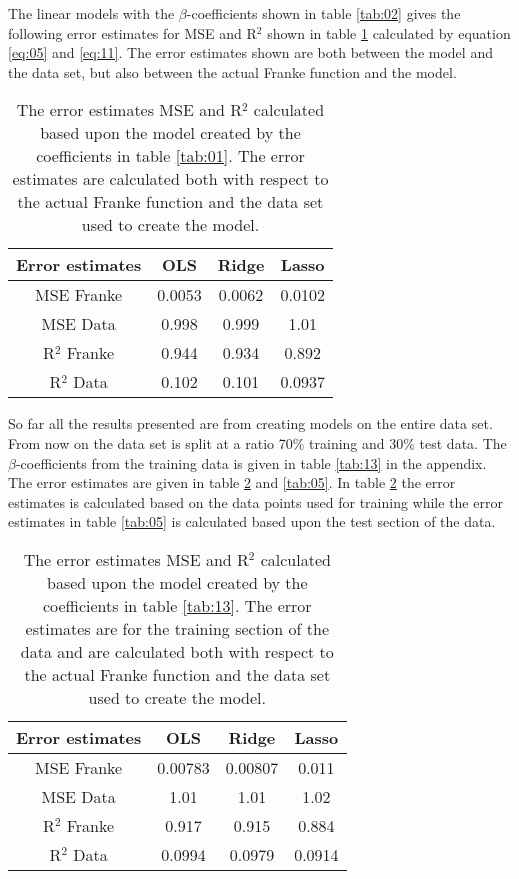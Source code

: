 \documentclass[uio,jmp,amsmath,amssymb,reprint,nofootinbib]{revtex4-1}
\numberwithin{equation}{section}
\begin{document}
The linear models with the \(\beta\)-coefficients shown in table \ref{tab:02} gives the following error estimates for MSE and R\(^2\) shown in table \ref{tab:03} calculated by equation \ref{eq:05} and \ref{eq:11}. The error estimates shown are both between the model and the data set, but also between the actual Franke function and the model.

\begin{table}
\begin{tabular}{|c|c|c|c|}\hline
Error estimates & OLS & Ridge & Lasso\\ \hline
MSE Franke & 0.0053 & 0.0062 & 0.0102 \\ \hline
MSE Data & 0.998 & 0.999 & 1.01 \\ \hline
R\(^2\) Franke & 0.944 & 0.934 & 0.892 \\ \hline
R\(^2\) Data & 0.102 & 0.101 & 0.0937 \\ \hline
\end{tabular}
\caption{The error estimates MSE and R\(^2\) calculated based upon the model created by the coefficients in table \ref{tab:01}. The error estimates are calculated both with respect to the actual Franke function and the data set used to create the model.}
\label{tab:03}
\end{table}

So far all the results presented are from creating models on the entire data set. From now on the data set is split at a ratio 70\% training and 30\% test data. The \(\beta\)-coefficients from the training data is given in table \ref{tab:13} in the appendix. The error estimates are given in table \ref{tab:04} and \ref{tab:05}. In table \ref{tab:04} the error estimates is calculated based on the data points used for training while the error estimates in table \ref{tab:05} is calculated based upon the test section of the data. 


\begin{table}
\begin{tabular}{|c|c|c|c|}\hline
Error estimates & OLS & Ridge & Lasso\\ \hline
MSE Franke & 0.00783 & 0.00807 & 0.011 \\ \hline
MSE Data & 1.01 & 1.01 & 1.02 \\ \hline
R\(^2\) Franke & 0.917 & 0.915 & 0.884 \\ \hline
R\(^2\) Data & 0.0994 & 0.0979 & 0.0914 \\ \hline
\end{tabular}
\caption{The error estimates MSE and R\(^2\) calculated based upon the model created by the coefficients in table \ref{tab:13}. The error estimates are for the training section of the data and are calculated both with respect to the actual Franke function and the data set used to create the model.}
\label{tab:04}
\end{table}
\end{document}

